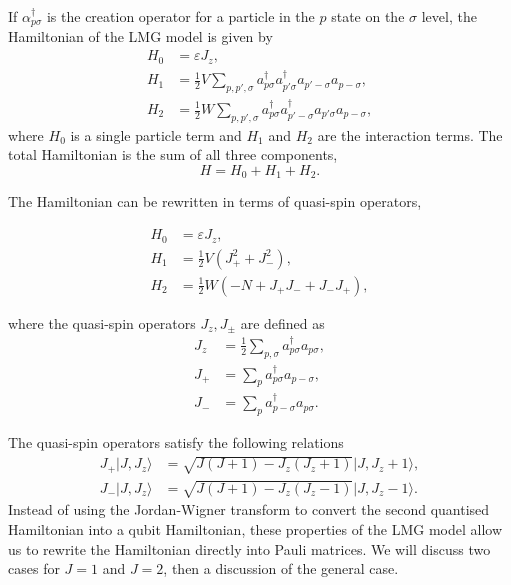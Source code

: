 If $ \alpha_{p\sigma}^{\dagger} $ is the creation operator for a particle in the $ p $ state on the $ \sigma $ level, the Hamiltonian of the LMG model is given by
\begin{equation}
	\label{eq:lmg_hamiltonian}
	\begin{aligned}
		H_0 &= \varepsilon J_z, \\
		H_1 &= \frac{1}{2} V \sum_{p,p',\sigma} a_{p\sigma}^\dagger a_{p'\sigma}^\dagger a_{p'-\sigma} a_{p-\sigma}, \\
		H_{2} &= \frac{1}{2} W \sum_{p,p',\sigma}a_{p\sigma}^\dagger a_{p'-\sigma}^\dagger a_{p'\sigma}a_{p-\sigma},
	\end{aligned}
\end{equation}
where $ H_0 $ is a single particle term and $ H_1 $ and $ H_2 $ are the interaction terms. The total Hamiltonian is the sum of all three components,
\[ H = H_0+H_1+H_2. \] 

The Hamiltonian can be rewritten in terms of quasi-spin operators,

\begin{equation}
	\label{eq:Hqs}
	\begin{aligned}
		H_0 &= \varepsilon J_z,	\\
		H_1 &= \frac{1}{2} V \left( J_+^2 + J_-^2 \right),\\
		H_2 &= \frac{1}{2} W \left( -N + J_+ J_- + J_- J_+ \right),
	\end{aligned}
\end{equation} 

where the quasi-spin operators $ J_z, J_\pm $ are defined as 
\begin{equation}
	\begin{aligned}
		J_z &= \frac{1}{2} \sum_{p,\sigma} a_{p\sigma}^\dagger a_{p\sigma}, \\
		J_+ &= \sum_{p} a_{p\sigma}^\dagger a_{p-\sigma}, \\
		J_- &= \sum_{p} a_{p-\sigma}^\dagger a_{p\sigma}.
	\end{aligned}
\end{equation}

The quasi-spin operators satisfy the following relations
\begin{align}
	\label{eq:jrel}
		J_+ \vert J,J_z\rangle &= \sqrt{J(J+1) - J_z(J_z + 1)} \vert J,J_z + 1\rangle,\\
		J_- \vert J,J_z\rangle &= \sqrt{J(J+1) - J_z(J_z - 1)} \vert J,J_z - 1\rangle.
\end{align}
Instead of using the Jordan-Wigner transform to convert the second quantised Hamiltonian into a qubit Hamiltonian, these properties of the LMG model allow us to rewrite the Hamiltonian directly into Pauli matrices. We will discuss two cases for $ J=1 $ and $ J=2 $, then a discussion of the general case. 
